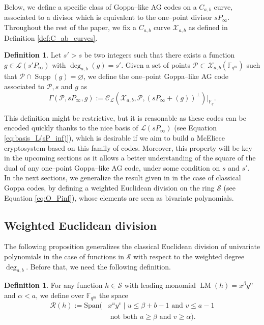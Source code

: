 \documentclass[lettersize,journal]{IEEEtran}
\theoremstyle{plain}
\theoremstyle{definition}
\newtheorem{definition}[thm]{Definition}
\theoremstyle{remark}
\newcommand{\calP}{\mathcal{P}}
\newcommand{\calL}{\mathcal{L}}
\newcommand{\calC}{\mathcal{C}}
\newcommand{\calR}{\mathcal{R}}
\newcommand{\calS}{\mathcal{S}}
\newcommand{\calX}{\mathcal{X}}
\newcommand{\fqm}{\mathbb{F}_{q^m}}
\newcommand{\fq}{\mathbb{F}_{q}}
\newcommand{\F}{\mathbb{F}}
\newcommand{\LM}[1]{\operatorname{LM}\left(#1\right)}
\newcommand{\Supp}{\operatorname{Supp}}
\newcommand{\degab}[1]{\deg_{a,b}\left(#1\right)}
\begin{document}
	Below, we define a specific class of Goppa--like AG codes on a $C_{a,b}$ curve, associated to a divisor which is equivalent to the one--point divisor $sP_\infty$. 
	\noindent Throughout the rest of the paper, we fix a $C_{a,b}$ curve $\calX_{a,b}$ as defined in Definition \ref{def:C_ab_curves}.
	\begin{definition} \label{def:one--point_Goppa--like_AG_codes_on_C_a,b_curves}
		Let $s'>s$ be two integers such that there exists a function $g \in \calL(s'P_\infty)$ with $\degab{g}=s'$. Given a set of points  $\calP \subset \calX_{a,b}(\F_{q^m})$ such that $\calP \cap \Supp(g) = \varnothing$, we define the one--point Goppa--like AG code associated to $\calP,s$ and $g$ as 
		\[\Gamma(\calP,sP_\infty,g) := \calC_{\calL}(\calX_{a,b},\calP,(sP_\infty+(g))^{\perp})|_{\fq}.\]
	\end{definition}
	This definition might be restrictive, but it is reasonable as these codes can be encoded quickly thanks to the nice basis of $\calL(sP_\infty)$ (see Equation \eqref{eq:basis_L(sP_inf)}), which is desirable if we aim to build a McEliece cryptosystem based on this family of codes. Moreover, this property will be key in the upcoming sections as it allows a better understanding of the square of the dual of any one--point Goppa--like AG code, under some condition on $s$ and $s'$. \\
	
	\noindent In the next sections, we generalize the result given in \cite{MT21} in the case of classical Goppa codes, by defining a weighted Euclidean division on the ring $\calS$ (see Equation \eqref{eq:O_Pinf}), whose elements are seen as bivariate polynomials. 
	\subsection{Weighted Euclidean division}
	\noindent The following proposition generalizes the classical Euclidean division of univariate polynomials in the case of functions in $\calS$ with respect to the weighted degree $\deg_{a,b}$. Before that, we need the following definition.
	
	\begin{definition} \label{def:remainder_space}
		For any function $h \in \calS$ with leading monomial $\LM{h}=x^\beta y^\alpha$ and $\alpha < a$, we define over $\fqm$ the space
\[\begin{aligned}
		\calR(h) := \text{Span}(&x^u y^v \mid u \leq \beta + b-1 \text{ and } v\leq a-1\\& \text{ not both }  u \geq \beta \text{ and } v \geq \alpha).
\end{aligned}\]


	\end{definition}
	
\end{document}
